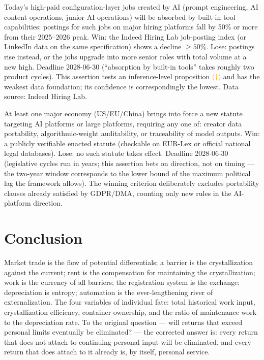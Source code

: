 \documentclass[11pt]{article}
\newcommand{\infmark}{\textcolor{orange}{(\(\dagger\))}}
\begin{document}
\begin{description}[leftmargin=2.2em,style=nextline]
\item[Assertion 5 (The next target of the recursion appears, confidence 50\%)]
Today's high-paid configuration-layer jobs created by AI (prompt engineering, AI content operations, junior AI operations) will be absorbed by built-in tool capabilities: postings for such jobs on major hiring platforms fall by 50\% or more from their 2025--2026 peak. Win: the Indeed Hiring Lab job-posting index (or LinkedIn data on the same specification) shows a decline $\geq 50\%$. Lose: postings rise instead, or the jobs upgrade into more senior roles with total volume at a new high. Deadline 2028-06-30 (``absorption by built-in tools'' takes roughly two product cycles). This assertion tests an inference-level proposition \infmark{} and has the weakest data foundation; its confidence is correspondingly the lowest. Data source: Indeed Hiring Lab.
\item[Assertion 6 (The political response on container ownership, confidence 50\%)]
At least one major economy (US/EU/China) brings into force a new statute targeting AI platforms or large platforms, requiring any one of: creator data portability, algorithmic-weight auditability, or traceability of model outputs. Win: a publicly verifiable enacted statute (checkable on EUR-Lex or official national legal databases). Lose: no such statute takes effect. Deadline 2028-06-30 (legislative cycles run in years; this assertion bets on direction, not on timing --- the two-year window corresponds to the lower bound of the maximum political lag the framework allows). The winning criterion deliberately excludes portability clauses already satisfied by GDPR/DMA, counting only new rules in the AI-platform direction.
\end{description}

\section{Conclusion}
Market trade is the flow of potential differentials; a barrier is the crystallization against the current; rent is the compensation for maintaining the crystallization; work is the currency of all barriers; the registration system is the exchange; depreciation is entropy; automation is the ever-lengthening river of externalization. The four variables of individual fate: total historical work input, crystallization efficiency, container ownership, and the ratio of maintenance work to the depreciation rate. To the original question --- will returns that exceed personal limits eventually be eliminated? --- the corrected answer is: every return that does not attach to continuing personal input will be eliminated, and every return that does attach to it already is, by itself, personal service.
\end{document}
